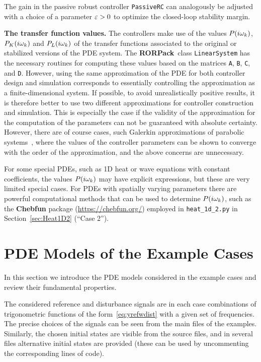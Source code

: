 \documentclass[11pt, a4paper]{amsart}
\theoremstyle{definition}
\numberwithin{equation}{section}
\newcommand{\RORname}{\textbf{RORPack}}
\begin{document}
The gain in the passive robust controller \texttt{PassiveRC} can analogously be adjusted with a choice of a parameter $\varepsilon>0$ to optimize the closed-loop stability margin.

\textbf{The transfer function values.} The controllers make use of the values $P(i\omega_k)$, $P_K(i\omega_k)$ and $P_L(i\omega_k)$ of the transfer functions associated to the original or stabilized versions of the PDE system.
The \RORname\ class \texttt{LinearSystem} has the necessary routines for computing these values based on the matrices \texttt{A}, \texttt{B}, \texttt{C}, and \texttt{D}. However, using the same approximation of the PDE for both controller design and simulation corresponds to essentially controlling the approximation as a finite-dimensional system. If possible, to avoid unrealistically positive results, it is therefore better to use two different approximations for controller construction and simulation. This is especially the case if the validity of the approximation for the computation of the parameters can not be guaranteed with absolute certainty. However, there are of course cases, such Galerkin approximations of parabolic systems~\cite{Mor94}, where the values of the controller parameters can be shown to converge with the order of the approximation, and the above concerns are unnecessary.

For some special PDEs, such as 1D heat or wave equations with constant coefficients, the values $P(i\omega_k)$ may have explicit expressions, but these are very limited special cases. For PDEs with spatially varying parameters there are powerful computational methods that can be used to determine $P(i\omega_k)$, such as the \textbf{Chebfun} package (\href{https://chebfun.org/}{https://chebfun.org/}) employed in \texttt{heat\_1d\_2.py} in Section~\ref{sec:Heat1D2} (``Case 2'').



\section{PDE Models of the Example Cases}
\label{sec:PDEcases}

In this section we introduce the PDE models considered in the example cases and review their fundamental properties.

The considered reference and disturbance signals are in each case combinations of trigonometric functions of the form~\eqref{eq:yrefwdist} with a given set of frequencies. The precise choices of the signals can be seen from the main files of the examples. Similarly, the chosen initial states are visible from the source files, and in several files alternative initial states are provided (these can be used by uncommenting the corresponding lines of code).
\end{document}
